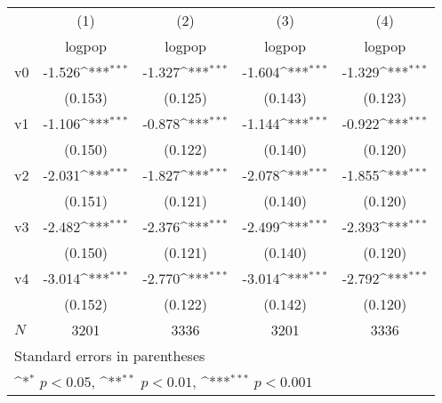 {
\def\sym#1{\ifmmode^{#1}\else\(^{#1}\)\fi}
\begin{tabular}{l*{4}{c}}
\toprule
            &\multicolumn{1}{c}{(1)}&\multicolumn{1}{c}{(2)}&\multicolumn{1}{c}{(3)}&\multicolumn{1}{c}{(4)}\\
            &\multicolumn{1}{c}{logpop}&\multicolumn{1}{c}{logpop}&\multicolumn{1}{c}{logpop}&\multicolumn{1}{c}{logpop}\\
\midrule
v0          &      -1.526\sym{***}&      -1.327\sym{***}&      -1.604\sym{***}&      -1.329\sym{***}\\
            &     (0.153)         &     (0.125)         &     (0.143)         &     (0.123)         \\
\addlinespace
v1          &      -1.106\sym{***}&      -0.878\sym{***}&      -1.144\sym{***}&      -0.922\sym{***}\\
            &     (0.150)         &     (0.122)         &     (0.140)         &     (0.120)         \\
\addlinespace
v2          &      -2.031\sym{***}&      -1.827\sym{***}&      -2.078\sym{***}&      -1.855\sym{***}\\
            &     (0.151)         &     (0.121)         &     (0.140)         &     (0.120)         \\
\addlinespace
v3          &      -2.482\sym{***}&      -2.376\sym{***}&      -2.499\sym{***}&      -2.393\sym{***}\\
            &     (0.150)         &     (0.121)         &     (0.140)         &     (0.120)         \\
\addlinespace
v4          &      -3.014\sym{***}&      -2.770\sym{***}&      -3.014\sym{***}&      -2.792\sym{***}\\
            &     (0.152)         &     (0.122)         &     (0.142)         &     (0.120)         \\
\midrule
\(N\)       &        3201         &        3336         &        3201         &        3336         \\
\bottomrule
\multicolumn{5}{l}{\footnotesize Standard errors in parentheses}\\
\multicolumn{5}{l}{\footnotesize \sym{*} \(p<0.05\), \sym{**} \(p<0.01\), \sym{***} \(p<0.001\)}\\
\end{tabular}
}

